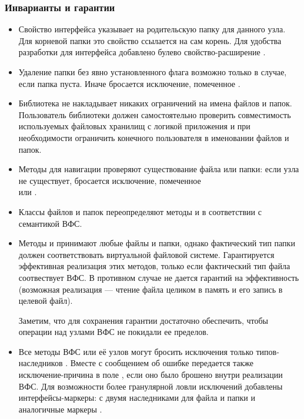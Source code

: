   \subsubsection{Инварианты и гарантии}
    \begin{itemize}
    \item Свойство  интерфейса  указывает на родительскую папку для данного узла. Для корневой папки это свойство ссылается на сам корень. Для удобства разработки для интерфейса  добавлено булево свойство-расширение .
    
    \item Удаление папки без явно установленного флага  возможно только в случае, если папка пуста. Иначе бросается исключение, помеченное .

    \item Библиотека не накладывает никаких ограничений на имена файлов и папок. Пользователь библиотеки должен самостоятельно проверить совместимость используемых файловых хранилищ с логикой приложения и при необходимости ограничить конечного пользователя в именовании файлов и папок.

    \item Методы для навигации проверяют существование файла или папки: если узла не существует, бросается исключение, помеченное\\  или .

    \item Классы файлов и папок переопределяют методы  и  в соответствии с семантикой ВФС.

    \item Методы  и  принимают любые файлы и папки, однако фактический тип папки должен соответствовать виртуальной файловой системе. Гарантируется эффективная реализация этих методов, только если фактический тип файла соотвествует ВФС. В противном случае не дается гарантий на эффективность (возможная реализация --- чтение файла целиком в память и его запись в целевой файл). 

    Заметим, что для сохранения гарантии достаточно обеспечить, чтобы операции над узлами ВФС не покидали ее пределов.

    \item Все методы ВФС или её узлов могут бросить исключения только типов-наследников . Вместе с сообщением об ошибке передается также исключение-причина в поле , если оно было брошено внутри реализации ВФС.
    Для возможности более гранулярной ловли исключений добавлены интерфейсы-маркеры:  с двумя наследниками для файла и папки и аналогичные маркеры .

    \end{itemize}

